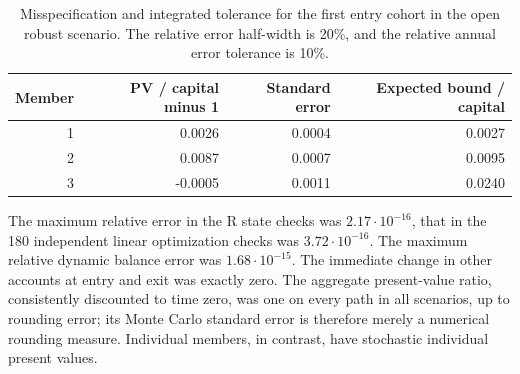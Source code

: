 \begin{table}[htbp]\centering\small
\caption{Misspecification and integrated tolerance for the first entry cohort in the open robust scenario. The relative error half-width is 20\%, and the relative annual error tolerance is 10\%.}
\begin{tabular}{rrrr}\toprule
Member & PV / capital minus 1 & Standard error & Expected bound / capital\\\midrule
1 & 0.0026 & 0.0004 & 0.0027\\
2 & 0.0087 & 0.0007 & 0.0095\\
3 & -0.0005 & 0.0011 & 0.0240\\
\bottomrule\end{tabular}\end{table}
The maximum relative error in the R state checks was $2.17\cdot10^{-16}$, that in the 180 independent linear optimization checks was $3.72\cdot10^{-16}$. The maximum relative dynamic balance error was $1.68\cdot10^{-15}$. The immediate change in other accounts at entry and exit was exactly zero. The aggregate present-value ratio, consistently discounted to time zero, was one on every path in all scenarios, up to rounding error; its Monte Carlo standard error is therefore merely a numerical rounding measure. Individual members, in contrast, have stochastic individual present values.

